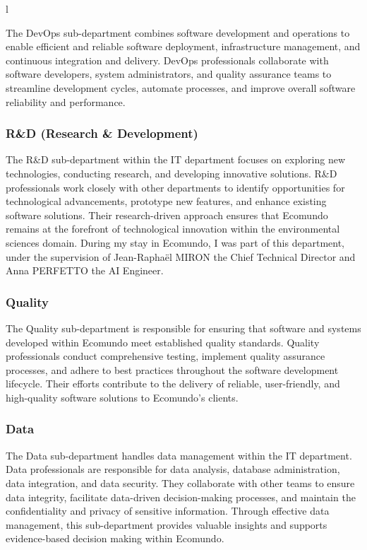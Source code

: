 l\documentclass[a4paper,12pt,twoside]{report}
\begin{document}
The DevOps sub-department combines software development and operations to enable efficient and reliable software deployment, infrastructure management, and continuous integration and delivery. DevOps professionals collaborate with software developers, system administrators, and quality assurance teams to streamline development cycles, automate processes, and improve overall software reliability and performance.

\subsubsection{R\&D (Research \& Development)}

The R\&D sub-department within the IT department focuses on exploring new technologies, conducting research, and developing innovative solutions. R\&D professionals work closely with other departments to identify opportunities for technological advancements, prototype new features, and enhance existing software solutions. Their research-driven approach ensures that Ecomundo remains at the forefront of technological innovation within the environmental sciences domain.
During my stay in Ecomundo, I was part of this department, under the supervision of Jean-Raphaël MIRON the Chief Technical Director and Anna PERFETTO the AI Engineer.

\subsubsection{Quality}

The Quality sub-department is responsible for ensuring that software and systems developed within Ecomundo meet established quality standards. Quality professionals conduct comprehensive testing, implement quality assurance processes, and adhere to best practices throughout the software development lifecycle. Their efforts contribute to the delivery of reliable, user-friendly, and high-quality software solutions to Ecomundo's clients.

\subsubsection{Data}

The Data sub-department handles data management within the IT department. Data professionals are responsible for data analysis, database administration, data integration, and data security. They collaborate with other teams to ensure data integrity, facilitate data-driven decision-making processes, and maintain the confidentiality and privacy of sensitive information. Through effective data management, this sub-department provides valuable insights and supports evidence-based decision making within Ecomundo.
\end{document}
